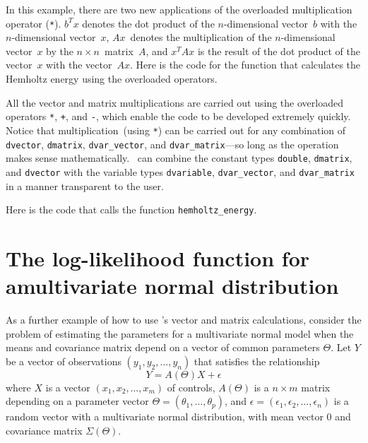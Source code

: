 \documentclass{admbmanual}
\begin{document}
In this example, there are two new applications of the overloaded multiplication
operator (\texttt{*}). $b^Tx$ denotes the dot product of the $n$-dimensional
vector~$b$ with the $n$-dimensional vector~$x$, $Ax$~denotes the multiplication
of the $n$-dimensional vector~$x$ by the $n\times n$~matrix~$A$, and $x^T Ax$ is
the result of the dot product of the vector~$x$ with the vector~$Ax$. Here is
the code for the function that calculates the Hemholtz energy using the
overloaded operators.


All the vector and matrix multiplications are carried out using the overloaded
operators \texttt{*}, \texttt{+}, and \texttt{-}, which enable the code to be
developed extremely quickly. Notice that multiplication~(using \texttt{*}) can
be carried out for any combination of \texttt{dvector}, \texttt{dmatrix},
\texttt{dvar\_vector}, and \texttt{dvar\_matrix}---so long as the operation
makes sense mathematically. \scAD\ can combine the constant types
\texttt{double}, \texttt{dmatrix}, and \texttt{dvector} with the variable types
\texttt{dvariable}, \texttt{dvar\_vector}, and \texttt{dvar\_matrix} in a manner
transparent to the user.

Here is the code that calls the function \texttt{hemholtz\_energy}.


\section{The log-likelihood function for a\br multivariate normal distribution}

As a further example of how to use \scAD's vector and matrix calculations,
consider the problem of estimating the parameters for a multivariate normal
model when the means and covariance matrix depend on a vector of common
parameters $\Theta$. Let $Y$ be a vector of observations $(y_1, y_2,\ldots,y_n)$
that satisfies the relationship
\begin{equation*}
  Y = A(\Theta)X + \epsilon
\end{equation*}
where $X$ is a vector $(x_1, x_2,\ldots,x_m)$ of controls, $A(\Theta)$ is a
$n\times m$ matrix depending on a parameter vector
$\Theta=(\theta_1,\ldots,\theta_p)$, and $\epsilon=(\epsilon_1,
\epsilon_2,\ldots,\epsilon_n)$ is a random vector with a multivariate normal
distribution, with mean vector $0$ and covariance matrix $\Sigma(\Theta)$.
\end{document}

